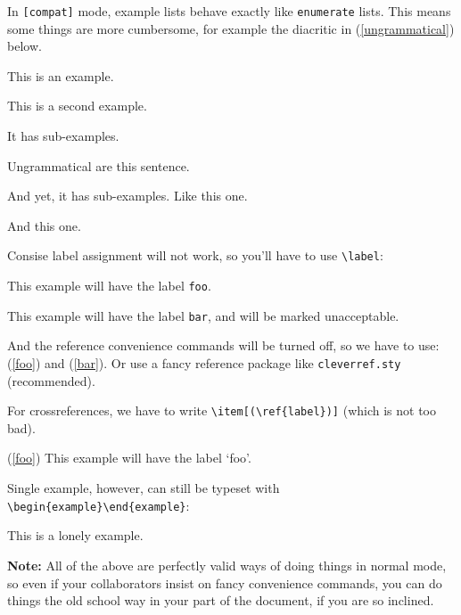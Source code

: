 \documentclass{article}
\begin{document}
%
\noindent In \verb|[compat]| mode, example lists behave exactly
like \verb|enumerate| lists. This means some things are more cumbersome,
for example the diacritic in (\ref{ungrammatical}) below.
    \begin{examples}
        \item This is an example.
        \item This is a second example.
              \begin{examples}
                  \item It has sub-examples.
                  \item \diacritic{*} Ungrammatical are this sentence.\label{ungrammatical}
                        \begin{examples}
                            \item And yet, it has sub-examples. Like this one.
                            \item And this one.
                        \end{examples}
              \end{examples}
    \end{examples}
Consise label assignment will not work, so you'll have to use \verb|\label|:
\begin{examples}
    \item\label{foo} This example will have the label \verb|foo|.
    \item\label{bar}\diacritic{\#} This example will have the label \verb|bar|, and will be marked 
                unacceptable.
\end{examples}
%
And the reference convenience commands will be turned off, so we have to use: 
(\ref{foo}) and (\ref{bar}). Or use a fancy reference package like \verb|cleverref.sty| (recommended).

For crossreferences, we have to write \verb|\item[(\ref{label})]| (which is not too bad).
\begin{examples}
    \item[(\ref{foo})] This example will have the label `foo'.
\end{examples}
%
Single example, however, can still be typeset with \verb|\begin{example}\end{example}|:
\begin{example}
    \item This is a lonely example.
\end{example}

\textbf{Note:} All of the above are perfectly valid ways of doing things in normal mode,
so even if your collaborators insist on fancy convenience commands, you can do things
the old school way in your part of the document, if you are so inclined.
\end{document}
